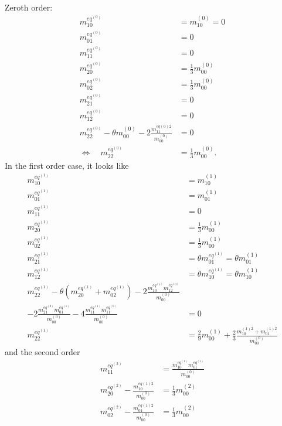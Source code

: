 Zeroth order:
\begin{equation}
  \begin{aligned}
    m_{10}^{eq^{(0)}} & = m_{10}^{(0)} = 0 \\
    m_{01}^{eq^{(0)}} & = 0 \\
    m_{11}^{eq^{(0)}} & = 0 \\
    m_{20}^{eq^{(0)}} & = \frac{1}{3} m_{00}^{(0)} \\
    m_{02}^{eq^{(0)}} & = \frac{1}{3} m_{00}^{(0)} \\
    m_{21}^{eq^{(0)}} & = 0 \\
    m_{12}^{eq^{(0)}} & = 0 \\
    m_{22}^{eq^{(0)}} - \theta m_{00}^{(0)} - 2\frac{ m_{11}^{eq(0)2}}{m_{00}^{(0)}} & = 0 \\
    \Leftrightarrow\quad m_{22}^{eq^{(0)}} &= \frac{1}{3} m_{00}^{(0)}.
  \end{aligned}
\end{equation}
In the first order case, it looks like
\begin{equation}
  \begin{aligned}
    m_{10}^{eq^{(1)}} & = m_{10}^{(1)} \\
    m_{01}^{eq^{(1)}} & = m_{01}^{(1)} \\
    m_{11}^{eq^{(1)}} & = 0 \\
    m_{20}^{eq^{(1)}} & = \frac{1}{3} m_{00}^{(1)} \\
    m_{02}^{eq^{(1)}} & = \frac{1}{3} m_{00}^{(1)} \\
    m_{21}^{eq^{(1)}} & = \theta m_{01}^{eq^{(1)}} = \theta m_{01}^{(1)}\\
    m_{12}^{eq^{(1)}} & = \theta m_{10}^{eq^{(1)}} = \theta m_{10}^{(1)} \\
    m_{22}^{eq^{(1)}} - \theta (m_{20}^{eq^{(1)}} + m_{02}^{eq^{(1)}})
    - 2\frac{ m_{10}^{eq^{(1)}} m_{12}^{eq^{(0)}} }{m_{00}^{(0)}}&\\
    - 2\frac{ m_{21}^{eq^{(0)}} m_{01}^{eq^{(1)}} }{m_{00}^{(0)}}
    - 4\frac{ m_{11}^{eq^{(1)}} m_{11}^{eq^{(0)}} }{m_{00}^{(0)}}&=0\\
    m_{22}^{eq^{(1)}} &= \frac{2}{9} m_{00}^{(1)}
    + \frac{2}{3}\frac{  m_{10}^{(1)2} +m_{01}^{(1)2} }{m_{00}^{(0)}}
  \end{aligned}
\end{equation}
and the second order
\begin{equation}
  \begin{aligned}
    m_{11}^{eq^{(2)}} & = \frac{ m_{10}^{eq^{(1)}}m_{01}^{eq^{(1)}}}{m_{00}^{(0)}} \\
    m_{20}^{eq^{(2)}} - \frac{ m_{10}^{eq(1)2}}{m_{00}^{(0)}} & = \frac{1}{3} m_{00}^{(2)} \\
    m_{02}^{eq^{(2)}} - \frac{ m_{01}^{eq(1)2}}{m_{00}^{(0)}} & = \frac{1}{3} m_{00}^{(2)}
  \end{aligned}
\end{equation}
